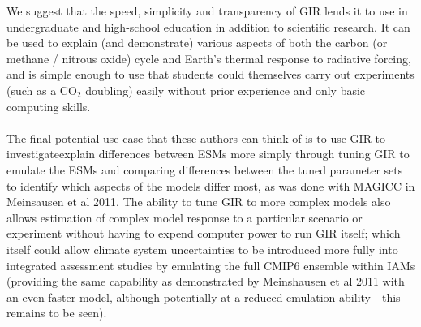 \documentclass[gmd, manuscript]{copernicus}
\begin{document}
We suggest that the speed, simplicity and transparency of GIR lends it to use in undergraduate and high-school education in addition to scientific research. It can be used to explain (and demonstrate) various aspects of both the carbon (or methane / nitrous oxide) cycle and Earth's thermal response to radiative forcing, and is simple enough to use that students could themselves carry out experiments (such as a CO$_2$ doubling) easily without prior experience and only basic computing skills.\\\\
The final potential use case that these authors can think of is to use GIR to investigateexplain differences between ESMs more simply through tuning GIR to emulate the ESMs and comparing differences between the tuned parameter sets to identify which aspects of the models differ most, as was done with MAGICC in Meinsausen et al 2011. The ability to tune GIR \citep{Tsutsui2017,Joos2013,Millar2016} to more complex models also allows estimation of complex model response to a particular scenario or experiment without having to expend computer power to run GIR itself; which itself could allow climate system uncertainties to be introduced more fully into integrated assessment studies by emulating the full CMIP6 ensemble within IAMs (providing the same capability as demonstrated by Meinshausen et al 2011 with an even faster model, although potentially at a reduced emulation ability - this remains to be seen).\\\\
\end{document}
